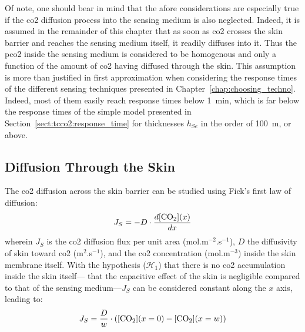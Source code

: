 Of note, one should bear in mind that the afore considerations are especially true if the \gls{co2} diffusion process into the sensing medium is also neglected. Indeed, it is assumed in the remainder of this chapter that as soon as \gls{co2} crosses the skin barrier and reaches the sensing medium itself, it readily diffuses into it. Thus the \gls{pco2} inside the sensing medium is considered to be homogenous and only a function of the amount of \gls{co2} having diffused through the skin. This assumption is more than justified in first approximation when considering the response times of the different sensing techniques presented in Chapter~\ref{chap:choosing_techno}. Indeed, most of them easily reach response times below 1~min, which is far below the response times of the simple model presented in Section~\ref{sect:tcco2:response_time} for thicknesses $h_{Se}$ in the order of 100~\textmu{}m, or above.

\subsection{Diffusion Through the Skin}\label{sect:tcco2:diffusion_dynamic}

The \gls{co2} diffusion across the skin barrier can be studied using Fick's first law of diffusion:
\begin{equation}
	J_S = -D \cdot \frac{d \ce{[CO_2]}(x)}{dx}
\end{equation}
wherein $J_S$ is the \gls{co2} diffusion flux per unit area (mol.m$^{-2}$.s$^{-1}$), $D$ the diffusivity of skin toward \gls{co2} (m$^2$.s$^{-1}$), and \ce{[CO_2]} the \gls{co2} concentration (mol.m$^{-3}$) inside the skin membrane itself. With the hypothesis ($\mathcal{H}_1$) that there is no \gls{co2} accumulation inside the skin itself---\ie{} that the capacitive effect of the skin is negligible compared to that of the sensing medium---$J_S$ can be considered constant along the $x$ axis, leading to:
\begin{equation}\label{eq:tcco2:fick_int}
	J_S = \frac{D}{w} \cdot \left( \ce{[CO_2]}(x=0) - \ce{[CO_2]}(x=w)  \right)
\end{equation}

